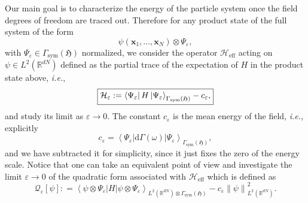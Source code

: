 \documentclass[11pt,a4paper,reqno]{amsart}
\theoremstyle{definition}
\numberwithin{equation}{section}
\newcommand{\beq}{\begin{equation}}
\newcommand{\eeq}{\end{equation}}
\newcommand{\lf}{\left}
\newcommand{\ri}{\right}
\newcommand{\bra}[1]{\lf\langle #1\ri|}
\newcommand{\ket}[1]{\lf|#1 \ri\rangle}
\newcommand{\mean}[3]{\bra{#1}#2\ket{#3}}
\newcommand{\xv}{\mathbf{x}}
\newcommand{\eps}{\varepsilon}
\newcommand{\ceps}{c_{\eps}}
\newcommand{\R}{\mathbb{R}}
\newcommand{\HH}{\mathcal{H}}
\newcommand{\HHe}{\mathcal{H}_{\mathrm{eff}}}
\newcommand{\Q}{\mathcal{Q}}
\begin{document}
Our main goal is to characterize the energy of the particle system once the field degrees of freedom are traced out. Therefore for any product state of the full system of the form 
\beq
	\psi(\xv_1, \ldots, \xv_N) \otimes \Psi_\varepsilon,
\eeq
with $ \Psi_{\eps}  \in \Gamma_{\mathrm{sym}}\lf(\mathfrak{H}\ri)$ normalized, we consider the operator $ \HHe $ acting on $ \psi \in L^2(\R^{dN}) $ defined as the partial trace of the expectation of $ H  $ in the product state above, \emph{i.e.},
\beq
	\label{eq:HHe}
	\framebox{$ \HH_{\eps} : = \mean{\Psi_{\eps}}{H}{\Psi_{\eps}}_{\Gamma_{\mathrm{sym}}\lf(\mathfrak{H}\ri)} - \ceps, $}
\eeq
and study its limit as $ \eps \to 0 $. The constant $ c_{\eps} $ is the mean energy of the field, \emph{i.e.}, explicitly
\begin{equation}
 	\label{eq:ceps}
  	c_{\varepsilon}= \mean{\Psi_{\eps}}{\mathrm{d}\Gamma(\omega)}{\Psi_\varepsilon}_{\Gamma_{\mathrm{sym}}\lf(\mathfrak{H}\ri)},
\end{equation}
and we have subtracted it for simplicity, since it just fixes the zero of the energy scale. Notice that one can take an equivalent point of view and investigate the limit $ \eps \to 0 $ of the quadratic form associated with $ \HHe $ which is defined as
\beq
	\Q_{\eps}[\psi] : = \mean{\psi \otimes \Psi_{\eps}}{H}{\psi \otimes \Psi_{\eps}}_{L^2(\R^{dN}) \otimes \Gamma_{\mathrm{sym}}\lf(\mathfrak{H}\ri)} - \ceps \lf\| \psi \ri\|_{L^2(\R^{dN})}^2.
\eeq
\end{document}
